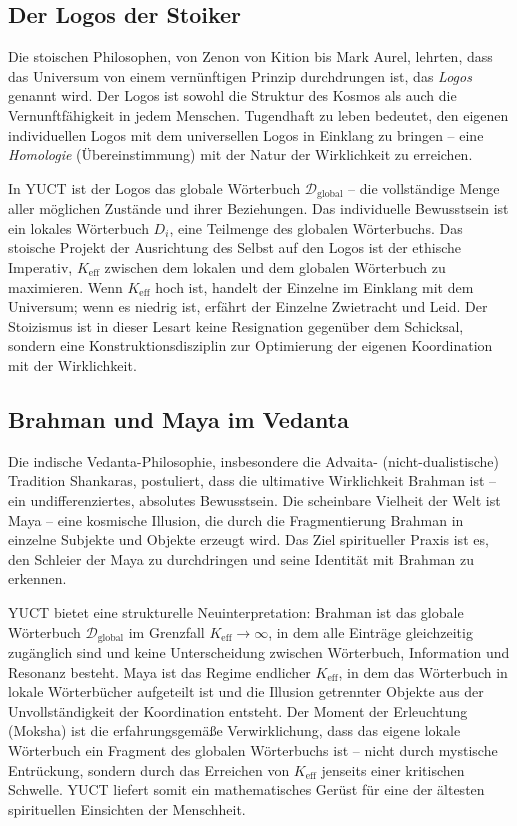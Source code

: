 \documentclass[12pt,a4paper]{article}
\begin{document}
	\subsection{Der Logos der Stoiker}
	
	Die stoischen Philosophen, von Zenon von Kition bis Mark Aurel, lehrten, dass das Universum von einem vernünftigen Prinzip durchdrungen ist, das \emph{Logos} genannt wird. Der Logos ist sowohl die Struktur des Kosmos als auch die Vernunftfähigkeit in jedem Menschen. Tugendhaft zu leben bedeutet, den eigenen individuellen Logos mit dem universellen Logos in Einklang zu bringen – eine \emph{Homologie} (Übereinstimmung) mit der Natur der Wirklichkeit zu erreichen.
	
	In YUCT ist der Logos das globale Wörterbuch \(\mathcal{D}_{\text{global}}\) – die vollständige Menge aller möglichen Zustände und ihrer Beziehungen. Das individuelle Bewusstsein ist ein lokales Wörterbuch \(D_i\), eine Teilmenge des globalen Wörterbuchs. Das stoische Projekt der Ausrichtung des Selbst auf den Logos ist der ethische Imperativ, \(K_{\mathrm{eff}}\) zwischen dem lokalen und dem globalen Wörterbuch zu maximieren. Wenn \(K_{\mathrm{eff}}\) hoch ist, handelt der Einzelne im Einklang mit dem Universum; wenn es niedrig ist, erfährt der Einzelne Zwietracht und Leid. Der Stoizismus ist in dieser Lesart keine Resignation gegenüber dem Schicksal, sondern eine Konstruktionsdisziplin zur Optimierung der eigenen Koordination mit der Wirklichkeit.
	
	\subsection{Brahman und Maya im Vedanta}
	
	Die indische Vedanta-Philosophie, insbesondere die Advaita- (nicht-dualistische) Tradition Shankaras, postuliert, dass die ultimative Wirklichkeit Brahman ist – ein undifferenziertes, absolutes Bewusstsein. Die scheinbare Vielheit der Welt ist Maya – eine kosmische Illusion, die durch die Fragmentierung Brahman in einzelne Subjekte und Objekte erzeugt wird. Das Ziel spiritueller Praxis ist es, den Schleier der Maya zu durchdringen und seine Identität mit Brahman zu erkennen.
	
	YUCT bietet eine strukturelle Neuinterpretation: Brahman ist das globale Wörterbuch \(\mathcal{D}_{\text{global}}\) im Grenzfall \(K_{\mathrm{eff}} \to \infty\), in dem alle Einträge gleichzeitig zugänglich sind und keine Unterscheidung zwischen Wörterbuch, Information und Resonanz besteht. Maya ist das Regime endlicher \(K_{\mathrm{eff}}\), in dem das Wörterbuch in lokale Wörterbücher aufgeteilt ist und die Illusion getrennter Objekte aus der Unvollständigkeit der Koordination entsteht. Der Moment der Erleuchtung (Moksha) ist die erfahrungsgemäße Verwirklichung, dass das eigene lokale Wörterbuch ein Fragment des globalen Wörterbuchs ist – nicht durch mystische Entrückung, sondern durch das Erreichen von \(K_{\mathrm{eff}}\) jenseits einer kritischen Schwelle. YUCT liefert somit ein mathematisches Gerüst für eine der ältesten spirituellen Einsichten der Menschheit.
	
\end{document}
